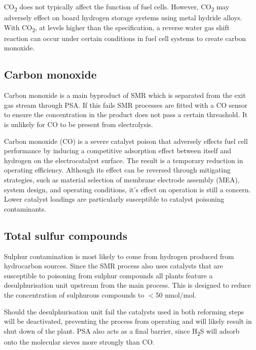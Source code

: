 CO\textsubscript{2} does not typically affect the function of fuel cells. However, CO\textsubscript{2} may adversely effect on board hydrogen storage systems using metal hydride alloys. With CO\textsubscript{2}, at levels higher than the specification, a reverse water gas shift reaction can occur under certain conditions in fuel cell systems to create carbon monoxide. \cite{InternationalStandardISO14687-2:20122012}

\subsection*{Carbon monoxide}
Carbon monoxide is a main byproduct of SMR which is separated from the exit gas stream through PSA. \cite{Muradov2015} If this fails SMR processes are fitted with a CO sensor to ensure the concentration in the product does not pass a certain threashold. \cite{Bacquart2018} It is unlikely for CO to be present from electrolysis.

Carbon monoxide (CO) is a severe catalyst poison that adversely effects fuel cell performance by inducing a competitive adsorption effect between itself and hydrogen on the electrocatalyst surface. The result is a temporary reduction in operating efficiency. \cite{InternationalStandardISO14687-2:20122012} Although its effect can be reversed through mitigating strategies, such as material selection of membrane electrode assembly (MEA), system design, and operating conditions, it's effect on operation is still a concern. Lower catalyst loadings are particularly susceptible to catalyst poisoning contaminants.

\subsection*{Total sulfur compounds}
Sulphur contamination is most likely to come from hydrogen produced from hydrocarbon sources. 
Since the SMR process also uses catalysts that are susceptible to poisoning from sulphur compounds all plants feature a desulphurisation unit upstream from the main process. \cite{Muradov2015} This is designed to reduce the concentration of sulphurous compounds to $<$50 nmol/mol. \cite{Bacquart2018}

Should the desulphurisation unit fail the catalysts used in both reforming steps will be deactivated, preventing the process from operating and will likely result in shut down of the plant. PSA also acts as a final barrier, since H\textsubscript{2}S will adsorb onto the molecular sieves more strongly than CO. \cite{Bacquart2018}

